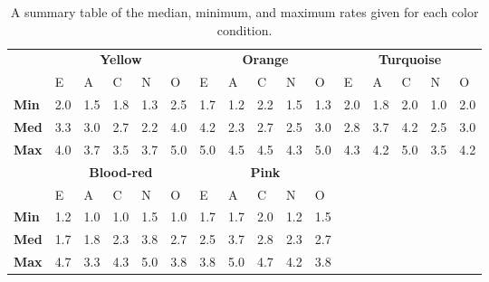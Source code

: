 \begin{table}[hbt!]
    \renewcommand{\arraystretch}{1}
    \begin{center}
        \begin{tabular}{p{}|
        p{}|p{}|p{}|p{}|p{}||
        p{}|p{}|p{}|p{}|p{}||
        p{}|p{}|p{}|p{}|p{}|}
            \cline{2-16}
            & \multicolumn{5}{c||}{\textbf{Yellow}} & \multicolumn{5}{c||}{\textbf{Orange}}
            & \multicolumn{5}{c|}{\textbf{Turquoise}} \\
            \cline{2-16}
            & E & A & C & N & O & E & A & C & N & O & E & A & C & N & O      \\
            \cline{2-16}
            \textbf{Min}    & 2.0 & 1.5 & 1.8 & 1.3 & 2.5 & 1.7 & 1.2 & 2.2 & 1.5 & 1.3 & 2.0 & 1.8 & 2.0 & 1.0 & 2.0  \\
            \textbf{Med}    & 3.3 & 3.0 & 2.7 & 2.2 & 4.0 & 4.2 & 2.3 & 2.7 & 2.5 & 3.0 & 2.8 & 3.7 & 4.2 & 2.5 & 3.0  \\
            \textbf{Max}    & 4.0 & 3.7 & 3.5 & 3.7 & 5.0 & 5.0 & 4.5 & 4.5 & 4.3 & 5.0 & 4.3 & 4.2 & 5.0 & 3.5 & 4.2 \\
            \cline{2-16}
            \cline{2-11}
            &  \multicolumn{5}{|c||}{\textbf{Blood-red}} & \multicolumn{5}{|c||}{\textbf{Pink}} \\
            \cline{2-11}
            & E & A & C & N & O & E & A & C & N & O            \\
            \cline{2-11}
            \textbf{Min}    & 1.2 & 1.0 & 1.0 & 1.5 & 1.0 & 1.7 & 1.7 & 2.0 & 1.2 & 1.5    \\
            \textbf{Med}    & 1.7 & 1.8 & 2.3 & 3.8 & 2.7 & 2.5 & 3.7 & 2.8 & 2.3 & 2.7    \\
            \textbf{Max}    & 4.7 & 3.3 & 4.3 & 5.0 & 3.8 & 3.8 & 5.0 & 4.7 & 4.2 & 3.8    \\
            \cline{2-11}
        \end{tabular}
        \caption{A summary table of the median, minimum, and maximum rates given for each color condition.}
        \label{table:medianMT2}
    \end{center}
\end{table}

